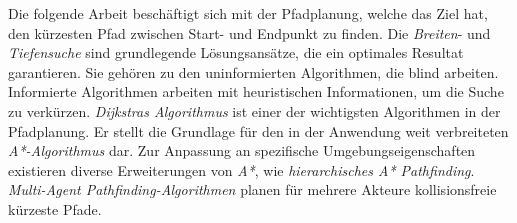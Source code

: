 \kurzfassung

Die folgende Arbeit beschäftigt sich mit der Pfadplanung, welche das Ziel hat, den kürzesten Pfad zwischen Start- und Endpunkt zu finden. Die \textit{Breiten}- und \textit{Tiefensuche} sind grundlegende Lösungsansätze, die ein optimales Resultat garantieren. Sie gehören zu den uninformierten Algorithmen, die blind arbeiten. Informierte Algorithmen arbeiten mit heuristischen Informationen, um die Suche zu verkürzen. \textit{Dijkstras Algorithmus} ist einer der wichtigsten Algorithmen in der Pfadplanung. Er stellt die Grundlage für den in der Anwendung weit verbreiteten \textit{A*-Algorithmus }dar. Zur Anpassung an spezifische Umgebungseigenschaften existieren diverse Erweiterungen von \textit{A*}, wie \textit{hierarchisches A* Pathfinding}. \textit{Multi-Agent Pathfinding-Algorithmen} planen für mehrere Akteure kollisionsfreie kürzeste Pfade.

